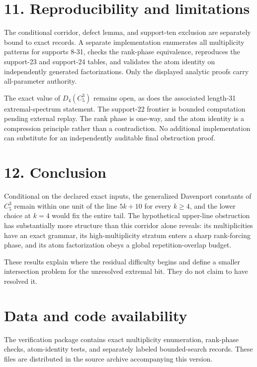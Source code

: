 \documentclass[
  11pt,
]{article}
\begin{document}
\hypertarget{reproducibility-and-limitations}{%
\section{11. Reproducibility and
limitations}\label{reproducibility-and-limitations}}

The conditional corridor, defect lemma, and support-ten exclusion are
separately bound to exact records. A separate implementation enumerates
all multiplicity patterns for supports 8-31, checks the rank-phase
equivalence, reproduces the support-23 and support-24 tables, and
validates the atom identity on independently generated factorizations.
Only the displayed analytic proofs carry all-parameter authority.

The exact value of \(D_4(C_5^3)\) remains open, as does the associated
length-31 extremal-spectrum statement. The support-22 frontier is
bounded computation pending external replay. The rank phase is one-way,
and the atom identity is a compression principle rather than a
contradiction. No additional implementation can substitute for an
independently auditable final obstruction proof.

\hypertarget{conclusion}{%
\section{12. Conclusion}\label{conclusion}}

Conditional on the declared exact inputs, the generalized Davenport
constants of \(C_5^3\) remain within one unit of the line \(5k+10\) for
every \(k\ge4\), and the lower choice at \(k=4\) would fix the entire
tail. The hypothetical upper-line obstruction has substantially more
structure than this corridor alone reveals: its multiplicities have an
exact grammar, its high-multiplicity stratum enters a sharp rank-forcing
phase, and its atom factorization obeys a global repetition-overlap
budget.

These results explain where the residual difficulty begins and define a
smaller intersection problem for the unresolved extremal bit. They do
not claim to have resolved it.

\hypertarget{data-and-code-availability}{%
\section{Data and code availability}\label{data-and-code-availability}}

The verification package contains exact multiplicity enumeration,
rank-phase checks, atom-identity tests, and separately labeled
bounded-search records. These files are distributed in the source
archive accompanying this version.
\end{document}
